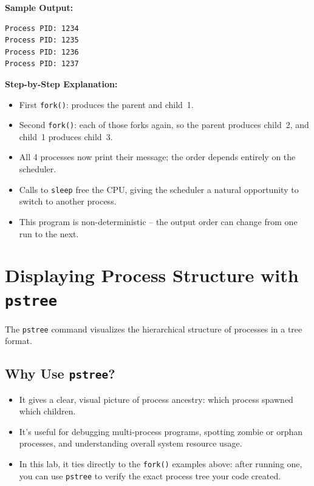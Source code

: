 \textbf{Sample Output:} %
\begin{lstlisting}[language=Terminal]
Process PID: 1234
Process PID: 1235
Process PID: 1236
Process PID: 1237
\end{lstlisting} %

\textbf{Step-by-Step Explanation:} %
\begin{itemize}
    \item First \texttt{fork()}: produces the parent and child~1. %
    \item Second \texttt{fork()}: each of those forks again, so the parent produces child~2, and child~1 produces child~3. %
    \item All 4 processes now print their message; the order depends entirely on the scheduler. %
    \item Calls to \texttt{sleep} free the CPU, giving the scheduler a natural opportunity to switch to another process. %
    \item This program is non-deterministic -- the output order can change from one run to the next. %
\end{itemize}

\section{Displaying Process Structure with \texttt{pstree}} %
The \texttt{pstree} command visualizes the hierarchical structure of processes in a tree format. %

\subsection{Why Use \texttt{pstree}?} %
\begin{itemize}
    \item It gives a clear, visual picture of process ancestry: which process spawned which children. %
    \item It's useful for debugging multi-process programs, spotting zombie or orphan processes, and understanding overall system resource usage. %
    \item In this lab, it ties directly to the \texttt{fork()} examples above: after running one, you can use \texttt{pstree} to verify the exact process tree your code created. %
\end{itemize}

